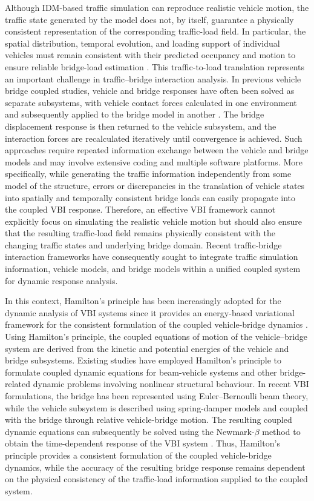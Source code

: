 \documentclass[journal]{IEEEtran}
\begin{document}
Although IDM-based traffic simulation can reproduce realistic vehicle motion, the traffic state generated by the model does not, by itself, guarantee a physically consistent representation of the corresponding traffic-load field. In particular, the spatial distribution, temporal evolution, and loading support of individual vehicles must remain consistent with their predicted occupancy and motion to ensure reliable bridge-load estimation \cite{wangxu2019}. This traffic-to-load translation represents an important challenge in traffic--bridge interaction analysis. In previous vehicle bridge coupled studies, vehicle and bridge responses have often been solved as separate subsystems, with vehicle contact forces calculated in one environment and subsequently applied to the bridge model in another \cite{yangfonder1996,green1994,pan2002}. The bridge displacement response is then returned to the vehicle subsystem, and the interaction forces are recalculated iteratively until convergence is achieved. Such approaches require repeated information exchange between the vehicle and bridge models and may involve extensive coding and multiple software platforms. More specifically, while generating the traffic information independently from some model of the structure, errors or discrepancies in the translation of vehicle states into spatially and temporally consistent bridge loads can easily propagate into the coupled VBI response. Therefore, an effective VBI framework cannot explicitly focus on simulating the realistic vehicle motion but should also ensure that the resulting traffic-load field remains physically consistent with the changing traffic states and underlying bridge domain. Recent traffic-bridge interaction frameworks have consequently sought to integrate traffic simulation information, vehicle models, and bridge models within a unified coupled system for dynamic response analysis.

In this context, Hamilton's principle has been increasingly adopted for the dynamic analysis of VBI systems since it provides an energy-based variational framework for the consistent formulation of the coupled vehicle-bridge dynamics \cite{mo2024}. Using Hamilton’s principle, the coupled equations of motion of the vehicle–bridge system are derived from the kinetic and potential energies of the vehicle and bridge subsystems. Existing studies have employed Hamilton's principle to formulate coupled dynamic equations for beam-vehicle systems and other bridge-related dynamic problems involving nonlinear structural behaviour. In recent VBI formulations, the bridge has been represented using Euler--Bernoulli beam theory, while the vehicle subsystem is described using spring-damper models and coupled with the bridge through relative vehicle-bridge motion. The resulting coupled dynamic equations can subsequently be solved using the Newmark-$\beta$ method to obtain the time-dependent response of the VBI system \cite{mo2024,newmark1959}. Thus, Hamilton's principle provides a consistent formulation of the coupled vehicle-bridge dynamics, while the accuracy of the resulting bridge response remains dependent on the physical consistency of the traffic-load information supplied to the coupled system.
\end{document}
